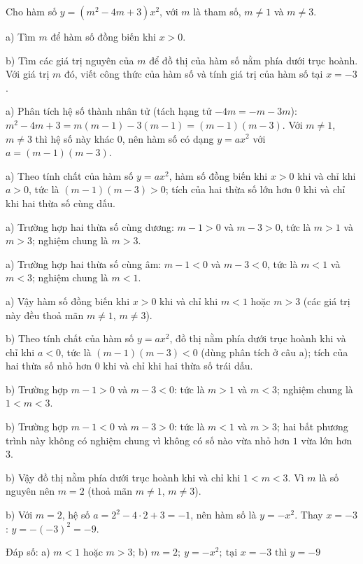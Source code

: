 \begin{problem}[9DS-HSB2-029]
Cho hàm số $y = (m^2 - 4m + 3)x^2$, với $m$ là tham số, $m \neq 1$ và $m \neq 3$.

a) Tìm $m$ để hàm số đồng biến khi $x > 0$.

b) Tìm các giá trị nguyên của $m$ để đồ thị của hàm số nằm phía dưới trục hoành. Với giá trị $m$ đó, viết công thức của hàm số và tính giá trị của hàm số tại $x = -3$.

\begin{solution}
a) Phân tích hệ số thành nhân tử (tách hạng tử $-4m = -m - 3m$): $m^2 - 4m + 3 = m(m - 1) - 3(m - 1) = (m - 1)(m - 3)$. Với $m \neq 1$, $m \neq 3$ thì hệ số này khác $0$, nên hàm số có dạng $y = ax^2$ với $a = (m - 1)(m - 3)$.

a) Theo tính chất của hàm số $y = ax^2$, hàm số đồng biến khi $x > 0$ khi và chỉ khi $a > 0$, tức là $(m - 1)(m - 3) > 0$; tích của hai thừa số lớn hơn $0$ khi và chỉ khi hai thừa số cùng dấu.

a) Trường hợp hai thừa số cùng dương: $m - 1 > 0$ và $m - 3 > 0$, tức là $m > 1$ và $m > 3$; nghiệm chung là $m > 3$.

a) Trường hợp hai thừa số cùng âm: $m - 1 < 0$ và $m - 3 < 0$, tức là $m < 1$ và $m < 3$; nghiệm chung là $m < 1$.

a) Vậy hàm số đồng biến khi $x > 0$ khi và chỉ khi $m < 1$ hoặc $m > 3$ (các giá trị này đều thoả mãn $m \neq 1$, $m \neq 3$).

b) Theo tính chất của hàm số $y = ax^2$, đồ thị nằm phía dưới trục hoành khi và chỉ khi $a < 0$, tức là $(m - 1)(m - 3) < 0$ (dùng phân tích ở câu a); tích của hai thừa số nhỏ hơn $0$ khi và chỉ khi hai thừa số trái dấu.

b) Trường hợp $m - 1 > 0$ và $m - 3 < 0$: tức là $m > 1$ và $m < 3$; nghiệm chung là $1 < m < 3$.

b) Trường hợp $m - 1 < 0$ và $m - 3 > 0$: tức là $m < 1$ và $m > 3$; hai bất phương trình này không có nghiệm chung vì không có số nào vừa nhỏ hơn $1$ vừa lớn hơn $3$.

b) Vậy đồ thị nằm phía dưới trục hoành khi và chỉ khi $1 < m < 3$. Vì $m$ là số nguyên nên $m = 2$ (thoả mãn $m \neq 1$, $m \neq 3$).

b) Với $m = 2$, hệ số $a = 2^2 - 4 \cdot 2 + 3 = -1$, nên hàm số là $y = -x^2$. Thay $x = -3$: $y = -(-3)^2 = -9$.

Đáp số: a) $\boxed{m < 1 \text{ hoặc } m > 3}$; b) $\boxed{m = 2;\ y = -x^2;\ \text{tại } x = -3 \text{ thì } y = -9}$
\end{solution}
\end{problem}

